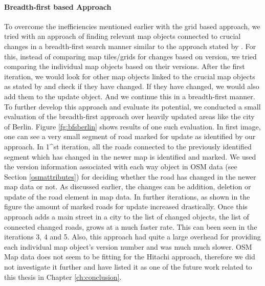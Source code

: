 \paragraph{Breadth-first based Approach}
To overcome the inefficiencies mentioned earlier with the grid based approach, we tried with an approach of finding relevant map objects connected to crucial changes in a breadth-first search manner similar to the approach stated by \citet{hitachi}. For this, instead of comparing map tiles/grids for changes based on version, we tried comparing the individual map objects based on their versions. After the first iteration, we would look for other map objects linked to the crucial map objects as stated by \citet{hitachi} and check if they have changed. If they have changed, we would also add them to the update object. And we continue this in a breadth-first manner. \\

To further develop this approach and evaluate its potential, we conducted a small evaluation of the breadth-first approach over heavily updated areas like the city of Berlin. Figure \ref{fg:bfsberlin} shows results of one such evaluation. In first image, one can see a very small segment of road marked for update as identified by our approach. In 1^{st} iteration, all the roads connected to the previously identified segment which has changed in the newer map is identified and marked. We used the version information associated with each way object in OSM data (see Section \ref{osmattributes}) for deciding whether the road has changed in the newer map data or not. As discussed earlier, the changes can be addition, deletion or update of the road element in map data. In further iterations, as shown in the figure the amount of marked roads for update increased drastically. Once this approach adds a main street in a city to the list of changed objects, the list of connected changed roads, grows at a much faster rate. This can been seen in the iterations 3, 4 and 5. Also, this approach had quite a large overhead for providing each individual map object's version number and was much much slower. OSM Map data does not seem to be fitting for the Hitachi approach, therefore we did not investigate it further and have listed it as one of the future work related to this thesis in Chapter \ref{ch:conclusion}.   




